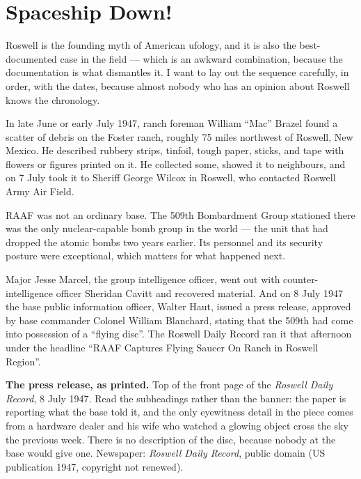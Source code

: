 \section{Spaceship Down!}\label{sec:spaceshipdown}

Roswell is the founding myth of American ufology, and it is also the best-documented case in the
field --- which is an awkward combination, because the documentation is what dismantles it. I want
to lay out the sequence carefully, in order, with the dates, because almost nobody who has an
opinion about Roswell knows the chronology.

In late June or early July 1947, ranch foreman William ``Mac'' Brazel found a scatter of debris on
the Foster ranch, roughly 75 miles northwest of Roswell, New Mexico. He described rubbery strips,
tinfoil, tough paper, sticks, and tape with flowers or figures printed on it. He collected some,
showed it to neighbours, and on 7 July took it to Sheriff George Wilcox in Roswell, who contacted
Roswell Army Air Field.

RAAF was not an ordinary base. The 509th Bombardment Group stationed there was the only
nuclear-capable bomb group in the world --- the unit that had dropped the atomic bombs two years
earlier. Its personnel and its security posture were exceptional, which matters for what happened
next.

Major Jesse Marcel, the group intelligence officer, went out with counter-intelligence officer
Sheridan Cavitt and recovered material. And on 8 July 1947 the base public information officer,
Walter Haut, issued a press release, approved by base commander Colonel William Blanchard, stating
that the 509th had come into possession of a ``flying disc''. The Roswell Daily Record ran it that
afternoon under the headline ``RAAF Captures Flying Saucer On Ranch in Roswell Region''.

\Needspace*{4.1in}
\begin{center}
\par\vspace{4pt}
{\RaggedRight\scriptsize\color{steel}\textbf{\textcolor{ufogreenink}{The press release, as printed.}}
Top of the front page of the \emph{Roswell Daily Record}, 8 July 1947. Read the subheadings
rather than the banner: the paper is reporting what the base told it, and the only eyewitness
detail in the piece comes from a hardware dealer and his wife who watched a glowing object cross
the sky the previous week. There is no description of the disc, because nobody at the base would
give one. Newspaper: \emph{Roswell Daily Record}, public domain (US publication 1947, copyright
not renewed).\par
{} \par}
\end{center}
\vspace{6pt}

